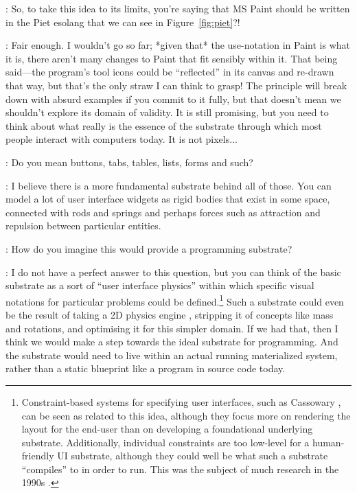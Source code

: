 \documentclass[runningheads]{llncs}
\newcommand{\T}{Tomas}
\newcommand{\J}{Joel}
\newcommand{\says}[2][gg]{\vspace{0.5em}\noindent\hangindent=0.5cm{\textsc{#1}}: #2}
\begin{document}
\says[\T]{So, to take this idea to its limits, you're saying that MS Paint should be written in the Piet esolang that we can see in Figure~\ref{fig:piet}?!}

\says[\J]{Fair enough. I wouldn't go so far; *given that* the use-notation in Paint is what it is, there aren't many changes to Paint that fit sensibly within it. That being said---the program's tool icons could be ``reflected'' in its canvas and re-drawn that way, but that's the only straw I can think to grasp! The principle will break down with absurd examples if you commit to it fully, but that doesn't mean we shouldn't explore its domain of validity. It is still promising, but you need to think about what really is the essence of the substrate through which most people interact with computers today. It is not pixels...}

\says[\T]{Do you mean buttons, tabs, tables, lists, forms and such?}

\says[\J]{I believe there is a more fundamental substrate behind all of those. You can model a lot of user interface widgets as rigid bodies that exist in some space, connected with rods and springs and perhaps forces such as attraction and repulsion between particular entities.}

\says[\T]{How do you imagine this would provide a programming substrate?}

\says[\J]{I do not have a perfect answer to this question, but you can think of the basic substrate as a sort of ``user interface physics'' within which specific visual notations for particular problems could be defined.\footnote{Constraint-based systems for specifying user interfaces, such as Cassowary \cite{borning-1997-constraints}, can be seen as related to this idea, although they focus more on rendering the layout for the end-user than on developing a foundational underlying substrate. Additionally, individual constraints are too low-level for a human-friendly UI substrate, although they could well be what such a substrate ``compiles'' to in order to run. This was the subject of much research in the 1990s \cite{myers-1992-uilangs}.} Such a substrate could even be the result of taking a 2D physics engine \cite{gabriel-nodate-virtual}, stripping it of concepts like mass and rotations, and optimising it for this simpler domain. If we had that, then I think we would make a step towards the ideal substrate for programming. And the substrate would need to live within an actual running materialized system, rather than a static blueprint like a program in source code today.}
\end{document}
